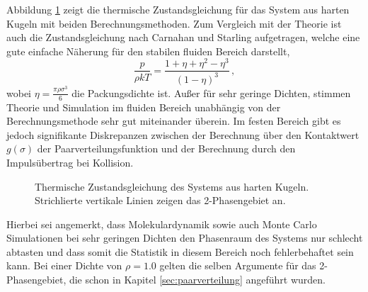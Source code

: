Abbildung \ref{fig:zustandsgleichung} zeigt die thermische Zustandsgleichung für das System aus harten Kugeln mit beiden Berechnungsmethoden. Zum Vergleich mit der Theorie ist auch die Zustandsgleichung nach Carnahan und Starling \cite{Carnahan1969} aufgetragen, welche eine gute einfache Näherung für den stabilen fluiden Bereich darstellt,
\begin{equation}
\frac{p}{\rho kT} = \frac{1 + \eta + \eta^2 -\eta^3}{(1 - \eta)^3} \, ,
\end{equation} 
wobei $\eta = \frac{\pi \rho \sigma^3}{6}$ die Packungsdichte ist. Außer für sehr geringe Dichten, stimmen Theorie und Simulation im fluiden Bereich unabhängig von der Berechnungsmethode sehr gut miteinander überein. Im festen Bereich gibt es jedoch signifikante Diskrepanzen zwischen der Berechnung über den Kontaktwert $g(\sigma)$ der Paarverteilungsfunktion und der Berechnung durch den Impulsübertrag bei Kollision.   
\begin{figure}[H]
 \centering
  \resizebox{0.9\textwidth}{!}{}
 \caption{Thermische Zustandsgleichung des Systems aus harten Kugeln. Strichlierte vertikale Linien zeigen das 2-Phasengebiet an.}
 \label{fig:zustandsgleichung}
\end{figure} 
Hierbei sei angemerkt, dass Molekulardynamik sowie auch Monte Carlo Simulationen bei sehr geringen Dichten den Phasenraum des Systems nur schlecht abtasten und dass somit die Statistik in diesem Bereich noch fehlerbehaftet sein kann. Bei einer Dichte von $\rho = 1.0 $ gelten die selben Argumente für das 2-Phasengebiet, die schon in Kapitel \ref{sec:paarverteilung} angeführt wurden. 

